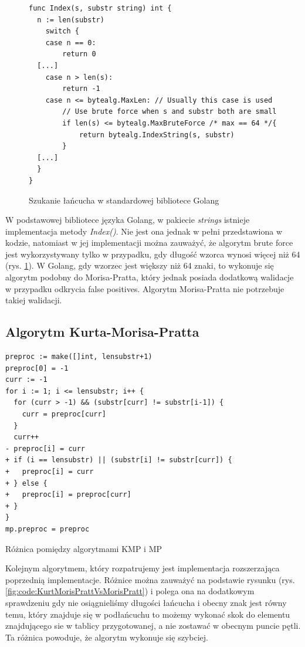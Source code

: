 \begin{figure}[h]
  \centering
  \begin{lstlisting}
func Index(s, substr string) int {
  n := len(substr)
	switch {
	case n == 0:
		return 0
  [...]
	case n > len(s):
		return -1
	case n <= bytealg.MaxLen: // Usually this case is used
		// Use brute force when s and substr both are small
		if len(s) <= bytealg.MaxBruteForce /* max == 64 */{
			return bytealg.IndexString(s, substr)
		}
  [...]
  }
}
  \end{lstlisting}
  \caption{Szukanie łańcucha w standardowej bibliotece Golang}
  \label{fig:code:golangSearchInsideString}
\end{figure}

W podstawowej bibliotece języka Golang, w pakiecie \textit{strings} istnieje 
implementacja metody \textit{Index()}. Nie jest ona jednak w pełni przedstawiona
w kodzie, natomiast w jej implementacji można zauważyć, że algorytm brute force
jest wykorzystywany tylko w przypadku, gdy długość wzorca wynosi więcej niż 64 
(rys. \ref{fig:code:golangSearchInsideString}). W Golang, gdy wzorzec jest większy niż
64 znaki, to wykonuje się algorytm podobny do Morisa-Pratta, który jednak 
posiada dodatkową walidacje w przypadku odkrycia false positives. 
Algorytm Morisa-Pratta nie potrzebuje takiej walidacji.


\subsection{Algorytm Kurta-Morisa-Pratta}

\begin{listing}[H]
    \begin{verbatim}
preproc := make([]int, lensubstr+1)
preproc[0] = -1
curr := -1
for i := 1; i <= lensubstr; i++ {
  for (curr > -1) && (substr[curr] != substr[i-1]) {
    curr = preproc[curr]
  }
  curr++
- preproc[i] = curr
+ if (i == lensubstr) || (substr[i] != substr[curr]) {
+   preproc[i] = curr
+ } else {
+   preproc[i] = preproc[curr]
+ }
}
mp.preproc = preproc
    \end{verbatim}
  \caption{Różnica pomiędzy algorytmami KMP i MP}
  \label{fig:code:KurtMorisPrattVsMorisPratt}
\end{listing}

Kolejnym algorytmem, który rozpatrujemy jest implementacja rozszerzająca 
poprzednią implementacje. Różnice można zauważyć na podstawie rysunku
(rys. \ref{fig:code:KurtMorisPrattVsMorisPratt}) i polega ona na dodatkowym sprawdzeniu
gdy nie osiągnieliśmy długości łańcucha i obecny znak jest równy temu, który 
znajduje się w podłańcuchu to możemy wykonać skok do elementu znajdującego
sie w tablicy przygotowanej, a nie zostawać w obecnym puncie pętli. Ta różnica
powoduje, że algorytm wykonuje się szybciej.


